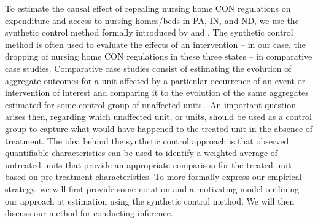 \documentclass[../Main.tex]{subfiles}
\begin{document}
To estimate the causal effect of repealing nursing home CON regulations on expenditure and access to nursing homes/beds in PA, IN, and ND, we use the synthetic control method formally introduced by \citet{abadie2003economic} and \citet{abadie2010synthetic}. The synthetic control method is often used to evaluate the effects of an intervention -- in our case, the dropping of nursing home CON regulations in these three states -- in comparative case studies. Comparative case studies consist of estimating the evolution of aggregate outcomes for a unit affected by a particular occurrence of an event or intervention of interest and comparing it to the evolution of the same aggregates estimated for some control group of unaffected units \citep{abadie2010synthetic}. An important question arises then, regarding which unaffected unit, or units, should be used as a control group to capture what would have happened to the treated unit in the absence of treatment. The idea behind the synthetic control approach is that observed quantifiable characteristics can be used to identify a weighted average of untreated units that provide an appropriate comparison for the treated unit based on pre-treatment characteristics. To more formally express our empirical strategy, we will first provide some notation and a motivating model outlining our approach at estimation using the synthetic control method. We will then discuss our method for conducting inference.
\end{document}
